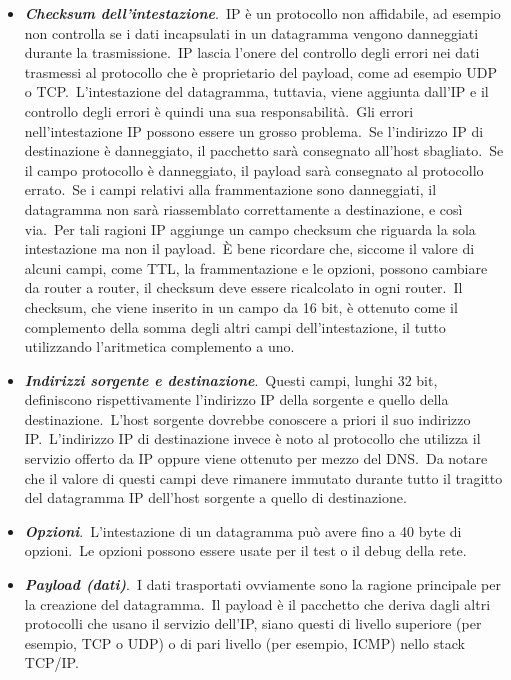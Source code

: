 \begin{itemize}
    \item \textbf{\emph{Checksum dell'intestazione}}.\
          IP è un protocollo non affidabile, ad esempio non controlla se i dati incapsulati in un datagramma vengono danneggiati durante la trasmissione.\
          IP lascia l'onere del controllo degli errori nei dati trasmessi al protocollo che è proprietario del payload, come ad esempio UDP o TCP.\
          L'intestazione del datagramma, tuttavia, viene aggiunta dall'IP e il controllo degli errori è quindi una sua responsabilità.\
          Gli errori nell'intestazione IP possono essere un grosso problema.\
          Se l'indirizzo IP di destinazione è danneggiato, il pacchetto sarà consegnato all'host sbagliato.\
          Se il campo protocollo è danneggiato, il payload sarà consegnato al protocollo errato.\
          Se i campi relativi alla frammentazione sono danneggiati, il datagramma non sarà riassemblato correttamente a destinazione, e così via.\
          Per tali ragioni IP aggiunge un campo checksum che riguarda la sola intestazione ma non il payload.\
          È bene ricordare che, siccome il valore di alcuni campi, come TTL, la frammentazione e le opzioni, possono cambiare da router a router, il checksum deve essere ricalcolato in ogni router.\
          Il checksum, che viene inserito in un campo da 16 bit, è ottenuto come il complemento della somma degli altri campi dell'intestazione, il tutto utilizzando l'aritmetica complemento a uno.
    \item \textbf{\emph{Indirizzi sorgente e destinazione}}.\
          Questi campi, lunghi 32 bit, definiscono rispettivamente l'indirizzo IP della sorgente e quello della destinazione.\
          L'host sorgente dovrebbe conoscere a priori il suo indirizzo IP.\
          L'indirizzo IP di destinazione invece è noto al protocollo che utilizza il servizio offerto da IP oppure viene ottenuto per mezzo del DNS.\
          Da notare che il valore di questi campi deve rimanere immutato durante tutto il tragitto del datagramma IP dell'host sorgente a quello di destinazione.
    \item \textbf{\emph{Opzioni}}.\
          L'intestazione di un datagramma può avere fino a 40 byte di opzioni.\
          Le opzioni possono essere usate per il test o il debug della rete.
    \item \textbf{\emph{Payload (dati)}}.\
          I dati trasportati ovviamente sono la ragione principale per la creazione del datagramma.\
          Il payload è il pacchetto che deriva dagli altri protocolli che usano il servizio dell'IP, siano questi di livello superiore (per esempio, TCP o UDP) o di pari livello (per esempio, ICMP) nello stack TCP/IP.
\end{itemize}

